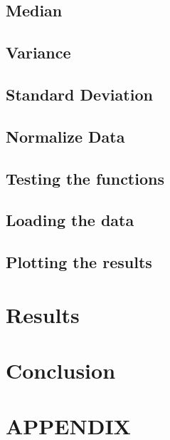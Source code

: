 \documentclass[10pt, a4paper, twocolumn]{article} %
\begin{document}
\subsection{Median}

\subsection{Variance}

\subsection{Standard Deviation}

\subsection{Normalize Data}

\subsection{Testing the functions}
                                                                                                                                                                                                                                                              
\subsection{Loading the data}

\subsection{Plotting the results}

\section{Results}

\section{Conclusion}

\section*{APPENDIX}






\printbibliography[title={Bibliography}] %

\end{document}
